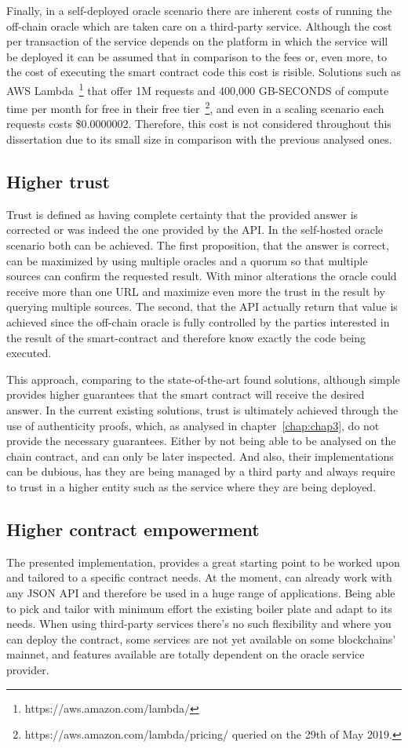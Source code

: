 Finally, in a self-deployed oracle scenario there are inherent costs of running the off-chain oracle which are taken care on a third-party service. Although the cost per transaction of the service depends on the platform in which the service will be deployed it can be assumed that in comparison to the fees or, even more, to the cost of executing the smart contract code this cost is risible. Solutions such as AWS Lambda~\footnote{https://aws.amazon.com/lambda/} that offer 1M requests and 400,000 GB-SECONDS of compute time per month for free in their free tier~\footnote{https://aws.amazon.com/lambda/pricing/ queried on the 29th of May 2019.}, and even in a scaling scenario each requests costs \$0.0000002. Therefore, this cost is not considered throughout this dissertation due to its small size in comparison with the previous analysed ones.

\subsection{Higher trust}

Trust is defined as having complete certainty that the provided answer is corrected or was indeed the one provided by the API. In the self-hosted oracle scenario both can be achieved. The first proposition, that the answer is correct, can be maximized by using multiple oracles and a quorum so that multiple sources can confirm the requested result. With minor alterations the oracle could receive more than one URL and maximize even more the trust in the result by querying multiple sources. The second, that the API actually return that value is achieved since the off-chain oracle is fully controlled by the parties interested in the result of the smart-contract and therefore know exactly the code being executed.

This approach, comparing to the state-of-the-art found solutions, although simple provides higher guarantees that the smart contract will receive the desired answer. In the current existing solutions, trust is ultimately achieved through the use of authenticity proofs, which, as analysed in chapter~\ref{chap:chap3}, do not provide the necessary guarantees. Either by not being able to be analysed on the chain contract, and can only be later inspected. And also, their implementations can be dubious, has they are being managed by a third party and always require to trust in a higher entity such as the service where they are being deployed.

\subsection{Higher contract empowerment}

The presented implementation, provides a great starting point to be worked upon and tailored to a specific contract needs. At the moment, can already work with any JSON API and therefore be used in a huge range of applications. Being able to pick and tailor with minimum effort the existing boiler plate and adapt to its needs. When using third-party services there's no such flexibility and where you can deploy the contract, some services are not yet available on some blockchains' mainnet, and features available are totally dependent on the oracle service provider.
